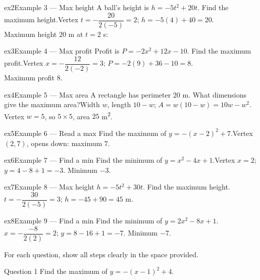 \documentclass[11pt]{article}
\begin{document}
\begin{example}{ex2}{Example 3 --- Max height}
A ball's height is $h=-5t^2+20t$. Find the maximum height.\soln Vertex $t=-\dfrac{20}{2(-5)}=2$; $h=-5(4)+40=20$. \\ Maximum height $20$ m at $t=2$ s:
\end{example}

\begin{example}{ex3}{Example 4 --- Max profit}
Profit is $P=-2x^2+12x-10$. Find the maximum profit.\soln Vertex $x=-\dfrac{12}{2(-2)}=3$; $P=-2(9)+36-10=8$. \\ Maximum profit $8$.
\end{example}

\begin{example}{ex4}{Example 5 --- Max area}
A rectangle has perimeter 20 m. What dimensions give the maximum area?\soln Width $w$, length $10-w$; $A=w(10-w)=10w-w^2$. \\ Vertex $w=5$, so $5\times5$, area $25$ m\textsuperscript{2}.
\end{example}

\begin{example}{ex5}{Example 6 --- Read a max}
Find the maximum of $y=-(x-2)^2+7$.\soln Vertex $(2,7)$, opens down: maximum $7$.
\end{example}

\begin{example}{ex6}{Example 7 --- Find a min}
Find the minimum of $y=x^2-4x+1$.\soln Vertex $x=2$; $y=4-8+1=-3$. Minimum $-3$.
\end{example}

\begin{example}{ex7}{Example 8 --- Max height}
$h=-5t^2+30t$. Find the maximum height.\soln $t=-\dfrac{30}{2(-5)}=3$; $h=-45+90=45$ m.
\end{example}

\begin{example}{ex8}{Example 9 --- Find a min}
Find the minimum of $y=2x^2-8x+1$.\soln $x=-\dfrac{-8}{2(2)}=2$; $y=8-16+1=-7$. Minimum $-7$.
\end{example}

\clearpage
{}
For each question, show all steps clearly in the space provided.

\begin{qbox}{Question 1}
Find the maximum of $y=-(x-1)^2+4$.\workspace{2.4cm}
\end{qbox}
\end{document}
